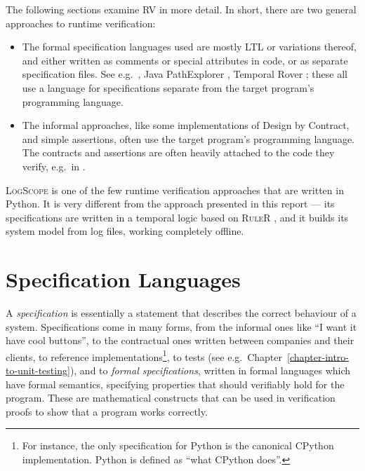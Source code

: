 The following sections examine RV in more detail. In short, there are two
general approaches to runtime verification:

\begin{itemize}

\item The formal specification languages used are mostly LTL or variations
  thereof, and either written as comments or special attributes in code, or as
  separate specification files. See e.g.\
  \cite{bauer06monitoring,bodden05efficientrv,kahkonen09lime}, Java
  PathExplorer \cite{havelund04jpax}, Temporal Rover
  \cite{drusinsky00temporalrover}; these all use a language for specifications
  separate from the target program's programming language.

\item The informal approaches, like some implementations of Design by Contract,
  and simple assertions, often use the target program's programming language.
  The contracts and assertions are often heavily attached to the code they
  verify, e.g.\ in \cite{bartetzko01jass,meyer92applyingdbc}.

\end{itemize}

\textsc{LogScope} \cite{barringer09tutorial} is one of the few runtime
verification approaches that are written in Python. It is very different from
the approach presented in this report --- its specifications are written in a
temporal logic based on \textsc{RuleR} \cite{barringer07ruler}, and it builds
its system model from log files, working completely offline.


\section{Specification Languages} \label{section-specifications}

A \textit{specification} is essentially a statement that describes the correct
behaviour of a system. Specifications come in many forms, from the informal
ones like ``I want it have cool buttons'', to the contractual ones written
between companies and their clients, to reference implementations\footnote{For
instance, the only specification for Python is the canonical CPython
implementation. Python is defined as ``what CPython does''.}, to tests (see
e.g.\ Chapter~\ref{chapter-intro-to-unit-testing}), and to \textit{formal
specifications}, written in formal languages which have formal semantics,
specifying properties that should verifiably hold for the program. These are
mathematical constructs that can be used in verification proofs to show that a
program works correctly.

